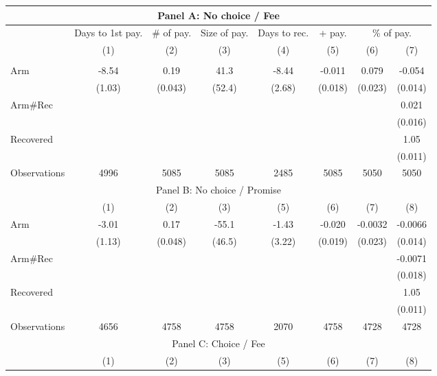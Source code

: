 \begin{tabular}{lccccccc}
\toprule
\multicolumn{8}{c}{Panel A: No choice / Fee} \\
\midrule
\midrule
      & Days to 1st pay. & \# of pay. & Size of pay. & Days to rec. & + pay. & \multicolumn{2}{c}{\% of pay.} \\
\midrule
      & (1)   & (2)   & (3)   & (4)   & (5)   & (6)   & (7) \\
\midrule
\midrule
      &       &       &       &       &       &       &  \\
Arm   & -8.54 & 0.19  & 41.3  & -8.44 & -0.011 & 0.079 & -0.054 \\
      & (1.03) & (0.043) & (52.4) & (2.68) & (0.018) & (0.023) & (0.014) \\
Arm\#Rec &       &       &       &       &       &       & 0.021 \\
      &       &       &       &       &       &       & (0.016) \\
Recovered &       &       &       &       &       &       & 1.05 \\
      &       &       &       &       &       &       & (0.011) \\
\midrule
Observations & 4996  & 5085  & 5085  & 2485  & 5085  & 5050  & 5050 \\
\midrule
\multicolumn{8}{c}{Panel B: No choice / Promise} \\
\midrule
\midrule
      & (1)   & (2)   & (3)   & (5)   & (6)   & (7)   & (8) \\
\midrule
\midrule
Arm   & -3.01 & 0.17  & -55.1 & -1.43 & -0.020 & -0.0032 & -0.0066 \\
      & (1.13) & (0.048) & (46.5) & (3.22) & (0.019) & (0.023) & (0.014) \\
Arm\#Rec &       &       &       &       &       &       & -0.0071 \\
      &       &       &       &       &       &       & (0.018) \\
Recovered &       &       &       &       &       &       & 1.05 \\
      &       &       &       &       &       &       & (0.011) \\
\midrule
Observations & 4656  & 4758  & 4758  & 2070  & 4758  & 4728  & 4728 \\
\midrule
\multicolumn{8}{c}{Panel C: Choice / Fee} \\
\midrule
\midrule
      & (1)   & (2)   & (3)   & (5)   & (6)   & (7)   & (8) \\

\end{tabular}
